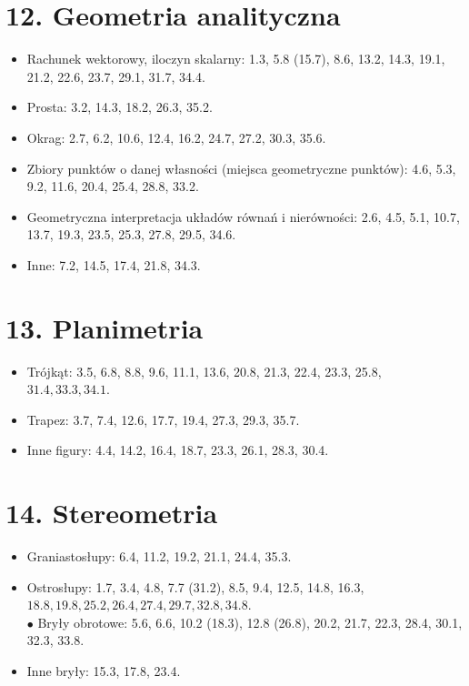 \documentclass[10pt]{article}
\begin{document}
\section*{12. Geometria analityczna}
\begin{itemize}
  \item Rachunek wektorowy, iloczyn skalarny: 1.3, 5.8 (15.7), 8.6, 13.2, 14.3, 19.1, 21.2, 22.6, 23.7, 29.1, 31.7, 34.4.
  \item Prosta: 3.2, 14.3, 18.2, 26.3, 35.2.
  \item Okrag: 2.7, 6.2, 10.6, 12.4, 16.2, 24.7, 27.2, 30.3, 35.6.
  \item Zbiory punktów o danej własności (miejsca geometryczne punktów): 4.6, 5.3, 9.2, 11.6, 20.4, 25.4, 28.8, 33.2.
  \item Geometryczna interpretacja układów równań i nierówności: 2.6, 4.5, 5.1, 10.7, 13.7, 19.3, 23.5, 25.3, 27.8, 29.5, 34.6.
  \item Inne: 7.2, 14.5, 17.4, 21.8, 34.3.
\end{itemize}

\section*{13. Planimetria}
\begin{itemize}
  \item Trójkąt: 3.5, 6.8, 8.8, 9.6, 11.1, 13.6, 20.8, 21.3, 22.4, 23.3, 25.8, $31.4,33.3,34.1$.
  \item Trapez: 3.7, 7.4, 12.6, 17.7, 19.4, 27.3, 29.3, 35.7.
  \item Inne figury: 4.4, 14.2, 16.4, 18.7, 23.3, 26.1, 28.3, 30.4.
\end{itemize}

\section*{14. Stereometria}
\begin{itemize}
  \item Graniastosłupy: 6.4, 11.2, 19.2, 21.1, 24.4, 35.3.
  \item Ostrosłupy: 1.7, 3.4, 4.8, 7.7 (31.2), 8.5, 9.4, 12.5, 14.8, 16.3, $18.8,19.8,25.2,26.4,27.4,29.7,32.8,34.8$.\\
$\bullet$ Bryły obrotowe: 5.6, 6.6, 10.2 (18.3), 12.8 (26.8), 20.2, 21.7, 22.3, 28.4, 30.1, 32.3, 33.8.
  \item Inne bryły: 15.3, 17.8, 23.4.
\end{itemize}
\end{document}

